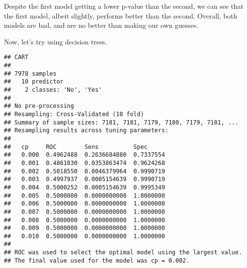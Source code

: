 \documentclass[
]{article}
\newenvironment{Shaded}{\begin{snugshade}}{\end{snugshade}}
\newcommand{\AttributeTok}[1]{\textcolor[rgb]{0.13,0.29,0.53}{#1}}
\newcommand{\ConstantTok}[1]{\textcolor[rgb]{0.56,0.35,0.01}{#1}}
\newcommand{\DecValTok}[1]{\textcolor[rgb]{0.00,0.00,0.81}{#1}}
\newcommand{\FloatTok}[1]{\textcolor[rgb]{0.00,0.00,0.81}{#1}}
\newcommand{\FunctionTok}[1]{\textcolor[rgb]{0.13,0.29,0.53}{\textbf{#1}}}
\newcommand{\NormalTok}[1]{#1}
\newcommand{\OtherTok}[1]{\textcolor[rgb]{0.56,0.35,0.01}{#1}}
\newcommand{\SpecialCharTok}[1]{\textcolor[rgb]{0.81,0.36,0.00}{\textbf{#1}}}
\newcommand{\StringTok}[1]{\textcolor[rgb]{0.31,0.60,0.02}{#1}}
\begin{document}
Despite the first model getting a lower p-value than the second, we can
see that the first model, albeit slightly, performs better than the
second. Overall, both models are bad, and are no better than making our
own guesses.

Now, let's try using decision trees.

\begin{Shaded}
\end{Shaded}

\begin{verbatim}
## CART 
## 
## 7978 samples
##   10 predictor
##    2 classes: 'No', 'Yes' 
## 
## No pre-processing
## Resampling: Cross-Validated (10 fold) 
## Summary of sample sizes: 7181, 7181, 7179, 7180, 7179, 7181, ... 
## Resampling results across tuning parameters:
## 
##   cp     ROC        Sens          Spec     
##   0.000  0.4962488  0.2636684880  0.7337554
##   0.001  0.4861030  0.0353863474  0.9624268
##   0.002  0.5018550  0.0046379964  0.9990719
##   0.003  0.4997937  0.0005154639  0.9990719
##   0.004  0.5000252  0.0005154639  0.9995349
##   0.005  0.5000000  0.0000000000  1.0000000
##   0.006  0.5000000  0.0000000000  1.0000000
##   0.007  0.5000000  0.0000000000  1.0000000
##   0.008  0.5000000  0.0000000000  1.0000000
##   0.009  0.5000000  0.0000000000  1.0000000
##   0.010  0.5000000  0.0000000000  1.0000000
## 
## ROC was used to select the optimal model using the largest value.
## The final value used for the model was cp = 0.002.
\end{verbatim}
\end{document}
